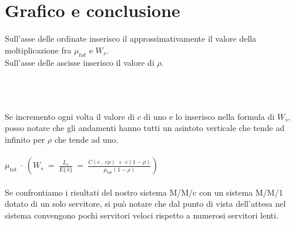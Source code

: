 \documentclass[12pt,a4paper]{article}
\begin{document}
\section{Grafico e conclusione}
Sull'asse delle ordinate inserisco il approssimativamente il valore della moltiplicazione fra $\mu_{tot}$ e $W_{s}$. \\
Sull'asse delle ascisse inserisco il valore di $\rho$. \\ \\
 \\ \\
Se incremento ogni volta il valore di $c$ di uno e lo inserisco nella formula di $W_{s}$, posso notare che gli andamenti hanno tutti un asintoto verticale che tende ad infinito per $\rho$ che tende ad uno.  \\ \\
$\mu_{tot} \ \cdot \ ( W_{s} \ = \ \frac{L_{s}}{E\{\lambda\}} \ = \ \frac{C(c \ , \ c\rho) \ + \ c(1-\rho)}{\mu_{tot}(1-\rho)} )$ \\ \\
Se confrontiamo i risultati del nostro sistema M/M/c con un sistema M/M/1 dotato di un solo servitore, si può notare che dal punto di vista dell'attesa nel sistema convengono pochi servitori veloci rispetto a numerosi servitori lenti.\\
\end{document}
